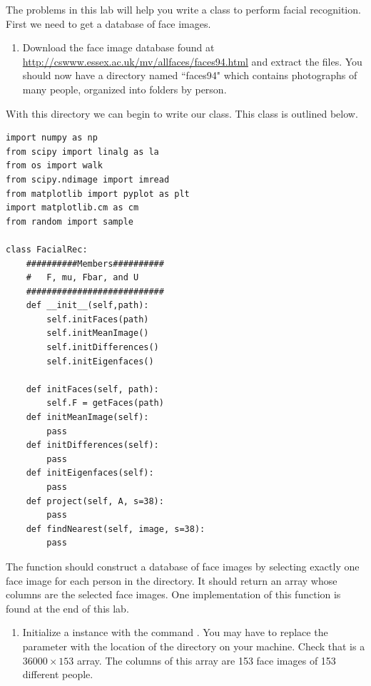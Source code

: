 \begin{problem}
\label{prob:getTrainingFaces}
The problems in this lab will help you write a class  to perform facial recognition. 
First we need to get a database of face images.
\begin{enumerate}
\item Download the  face image database found at \url{http://cswww.essex.ac.uk/mv/allfaces/faces94.html} and extract the files.
You should now have a directory named ``faces94" which contains photographs of many people, organized into folders by person.
\end{enumerate}
With this directory we can begin to write our  class. This class is outlined below.
\begin{lstlisting}
import numpy as np
from scipy import linalg as la
from os import walk
from scipy.ndimage import imread
from matplotlib import pyplot as plt
import matplotlib.cm as cm 
from random import sample

class FacialRec:
    ##########Members##########
    #   F, mu, Fbar, and U 
    ###########################
    def __init__(self,path):
        self.initFaces(path)
        self.initMeanImage()
        self.initDifferences()
        self.initEigenfaces()

    def initFaces(self, path):
        self.F = getFaces(path)
    def initMeanImage(self):
        pass
    def initDifferences(self):
        pass
    def initEigenfaces(self):
        pass
    def project(self, A, s=38):
        pass
    def findNearest(self, image, s=38):
        pass
\end{lstlisting}

The function  should construct a database of face images by selecting exactly one face image for each person in the directory.
It should return an array whose columns are the selected face images.
One implementation of this function is found at the end of this lab.

\begin{enumerate}
\item Initialize a  instance with the command . You may have to replace the parameter  with the location of the directory  on your machine. Check that  is a $36000 \times 153$ array. The columns of this array are 153 face images of 153 different people.
\end{enumerate}
\end{problem}



